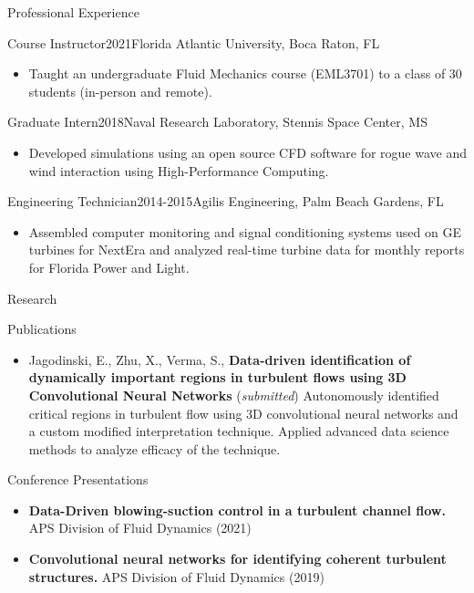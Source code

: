 \documentclass[]{mcdowellcv}
\begin{document}
	\begin{cvsection}{Professional Experience}
		\begin{cvsubsection}{Course Instructor}{}{2021}{Florida Atlantic University, Boca Raton, FL}
			\begin{itemize} 
			\item Taught an undergraduate Fluid Mechanics course (EML3701) to a class of 30 students (in-person and remote).
			\end{itemize}
		\end{cvsubsection}
		
		\begin{cvsubsection}{Graduate Intern}{}{2018}{Naval Research Laboratory, Stennis Space Center, MS}
			\begin{itemize}
            	\item Developed simulations using an open source CFD software for rogue wave and wind interaction using High-Performance Computing.
			\end{itemize}
		\end{cvsubsection}
		
			\begin{cvsubsection}{Engineering Technician}{}{2014-2015}{Agilis Engineering, Palm Beach Gardens, FL}
			\begin{itemize}
            	\item Assembled computer monitoring and signal conditioning systems used on GE turbines for NextEra and analyzed real-time turbine data for monthly reports for Florida Power and Light.
			\end{itemize}
		\end{cvsubsection}
	\end{cvsection}
	
		\begin{cvsection}{Research}
		\begin{cvsubsection}{Publications}{}{}
			\begin{itemize}
				\item Jagodinski, E., Zhu, X., Verma, S., \textbf{Data-driven identification of dynamically important regions in turbulent flows using 3D Convolutional Neural Networks} (\textit{submitted})  Autonomously identified critical regions in turbulent flow using 3D convolutional neural networks and a custom modified interpretation technique. Applied advanced data science methods to analyze efficacy of the technique.
			\end{itemize}
		\end{cvsubsection}
		
		\begin{cvsubsection}{Conference Presentations}{}{}
			\begin{itemize}
				\item  \textbf{Data-Driven blowing-suction control in a turbulent channel flow.}  APS Division of Fluid Dynamics (2021)
				\item \textbf{Convolutional neural networks for identifying coherent turbulent structures.} APS Division of Fluid Dynamics (2019)
			\end{itemize}
		\end{cvsubsection}
	\end{cvsection}
	
\end{document}
